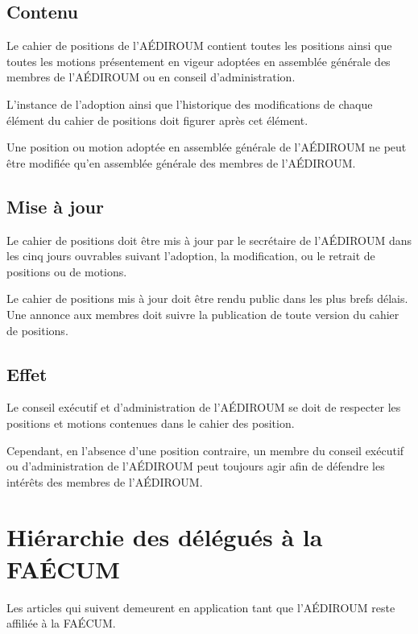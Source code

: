 \documentclass{aediroum}
\begin{document}
\subsection{Contenu}\label{sec:contenu-positions}

Le cahier de positions de l'AÉDIROUM contient toutes les positions ainsi que toutes les motions présentement en vigeur adoptées en assemblée générale des membres de l'AÉDIROUM ou en conseil d'administration.

L'instance de l'adoption ainsi que l'historique des modifications de chaque élément du cahier de positions doit figurer après cet élément.

Une position ou motion adoptée en assemblée générale de l'AÉDIROUM ne peut être modifiée qu'en assemblée générale des membres de l'AÉDIROUM.

\subsection{Mise à jour}\label{sec:mise-a-jour-positions}

Le cahier de positions doit être mis à jour par le secrétaire de l'AÉDIROUM dans les cinq jours ouvrables suivant l'adoption, la modification, ou le retrait de positions ou de motions.

Le cahier de positions mis à jour doit être rendu public dans les plus brefs délais. Une annonce aux membres doit suivre la publication de toute version du cahier de positions.

\subsection{Effet}\label{sec:effet-positions}

Le conseil exécutif et d'administration de l'AÉDIROUM se doit de respecter les positions et motions contenues dans le cahier des position.

Cependant, en l'absence d'une position contraire, un membre du conseil exécutif ou d'administration de l'AÉDIROUM peut toujours agir afin de défendre les intérêts des membres de l'AÉDIROUM.

\section{Hiérarchie des délégués à la FAÉCUM}\label{sec:hierarchie-delegues-faecum}

Les articles qui suivent demeurent en application tant que l'AÉDIROUM reste affiliée à la FAÉCUM.
\end{document}
